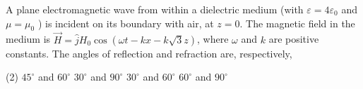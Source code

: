 \begin{enumerate}
\begin{minipage}{\textwidth}
	\item A plane electromagnetic wave from within a dielectric medium (with $\varepsilon=4 \varepsilon_{0}$ and $\mu=\mu_{0}$ ) is incident on its boundary with air, at $z=0$. The magnetic field in the medium is $\vec{H}=\hat{j} H_{0} \cos (\omega t-k x-k \sqrt{3} z)$, where $\omega$ and $k$ are positive constants.
	The angles of reflection and refraction are, respectively,
\end{minipage}
\begin{tasks}(2)
	\task[\textbf{A.}] $45^{\circ}$ and $60^{\circ}$
	\task[\textbf{B.}]$30^{\circ}$ and $90^{\circ}$
	\task[\textbf{C.}]$30^{\circ}$ and $60^{\circ}$
	\task[\textbf{D.}]$60^{\circ}$ and $90^{\circ}$
\end{tasks}


\end{enumerate}
